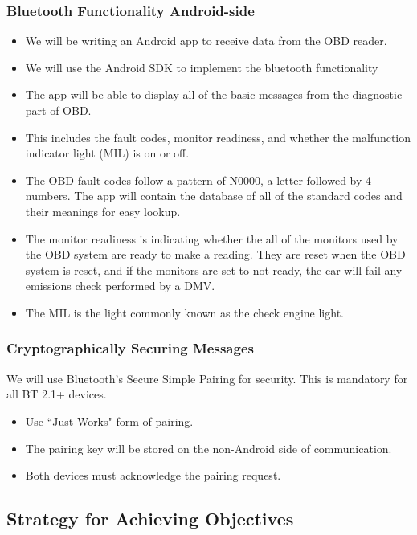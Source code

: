 \documentclass[12pt,letterpaper]{article}
\begin{document}
\subsubsection{Bluetooth Functionality Android-side}
\begin{itemize}
	\item We will be writing an Android app to receive data from the OBD reader.
	\item We will use the Android SDK to implement the bluetooth functionality
	\item The app will be able to display all of the basic messages from the diagnostic part of OBD.
	\item This includes the fault codes, monitor readiness, and whether the malfunction indicator light (MIL) is on or off.
	\item The OBD fault codes follow a pattern of N0000, a letter followed by 4 numbers. The app will contain the database of all of the standard codes and their meanings for easy lookup. 
	\item  The monitor readiness is indicating whether the all of the monitors used by the OBD system are ready to make a reading. They are reset when the OBD system is reset, and if the monitors are set to not ready, the car will fail any emissions check performed by a DMV. 
	\item The MIL is the light commonly known as the check engine light. 
\end{itemize}

\subsubsection{Cryptographically Securing Messages}
We will use Bluetooth's Secure Simple Pairing for security. This is mandatory for all BT 2.1+ devices.

\begin{itemize}
	\item Use ``Just Works" form of pairing.
	\item The pairing key will be stored on the non-Android side of communication.
	\item Both devices must acknowledge the pairing request.
\end{itemize}

\subsection{Strategy for Achieving Objectives}
\end{document}
